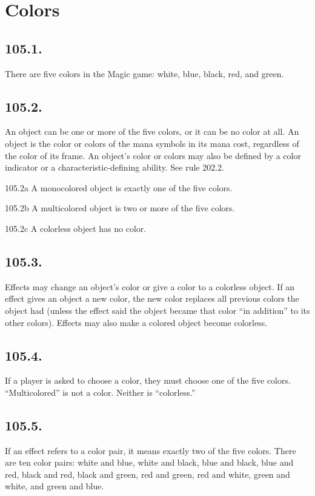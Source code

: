 \section{Colors}
\subsection*{105.1.}
There are five colors in the Magic game: white, blue, black, red, and green.

\subsection*{105.2.}
An object can be one or more of the five colors, or it can be no color at all. An object is the color or colors of the mana symbols in its mana cost, regardless of the color of its frame. An object’s color or colors may also be defined by a color indicator or a characteristic-defining ability. See rule 202.2.

105.2a A monocolored object is exactly one of the five colors.

105.2b A multicolored object is two or more of the five colors.

105.2c A colorless object has no color.

\subsection*{105.3.}
Effects may change an object’s color or give a color to a colorless object. If an effect gives an object a new color, the new color replaces all previous colors the object had (unless the effect said the object became that color “in addition” to its other colors). Effects may also make a colored object become colorless.

\subsection*{105.4.}
If a player is asked to choose a color, they must choose one of the five colors. “Multicolored” is not a color. Neither is “colorless.”

\subsection*{105.5.}
If an effect refers to a color pair, it means exactly two of the five colors. There are ten color pairs: white and blue, white and black, blue and black, blue and red, black and red, black and green, red and green, red and white, green and white, and green and blue.

